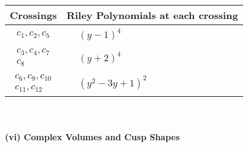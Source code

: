 \documentclass[1p]{elsarticle_modified}
\theoremstyle{definition}
\begin{document}
\begin{tabular}{m{50pt}|m{274pt}}
Crossings & \hspace{64pt}Riley Polynomials at each crossing \\
\hline $$\begin{aligned}c_{1},c_{2},c_{5}\end{aligned}$$&$\begin{aligned}
&(y-1)^4
\end{aligned}$\\
\hline $$\begin{aligned}c_{3},c_{4},c_{7}\\c_{8}\end{aligned}$$&$\begin{aligned}
&(y+2)^4
\end{aligned}$\\
\hline $$\begin{aligned}c_{6},c_{9},c_{10}\\c_{11},c_{12}\end{aligned}$$&$\begin{aligned}
&(y^2-3 y+1)^2
\end{aligned}$\\
\hline
\end{tabular}\\~\\
\newpage\flushleft \textbf{(vi) Complex Volumes and Cusp Shapes}
\end{document}

